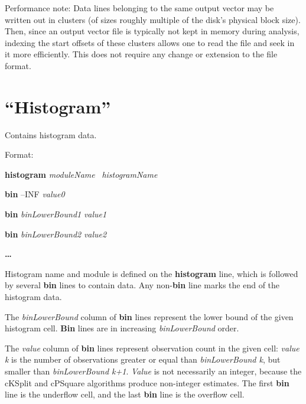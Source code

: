 Performance note: Data lines belonging to the same output vector may be
written out in clusters (of sizes roughly multiple of the disk's
physical block size). Then, since an output vector file is typically
not kept in memory during analysis, indexing the start offsets of these
clusters allows one to read the file and seek in it more efficiently.
This does not require any change or extension to the file format.

\section{``Histogram''}

Contains histogram data.

Format:

\textbf{histogram} \textit{moduleName} \ \textit{histogramName}

\textbf{bin} {--}INF \textit{value0}

\textbf{bin} \textit{binLowerBound1} \textit{value1}

\textbf{bin} \textit{binLowerBound2} \textit{value2}

\textbf{{\dots}}

Histogram name and module is defined on the \textbf{histogram} line,
which is followed by several \textbf{bin} lines to contain data. Any
non{}-\textbf{bin} line marks the end of the histogram data.

The \textit{binLowerBound }column of \textbf{bin} lines represent the
lower bound of the given histogram cell. \textbf{Bin} lines are in
increasing \textit{binLowerBound} order.

The \textit{value} column of \textbf{bin} lines represent observation
count in the given cell: \textit{value k} is the number of observations
greater or equal than \textit{binLowerBound k}, but smaller than
\textit{binLowerBound k+1}. \textit{Value} is not necessarily an
integer, because the cKSplit and cPSquare algorithms produce
non{}-integer estimates. The first \textbf{bin} line is the underflow
cell, and the last \textbf{bin} line is the overflow cell.



